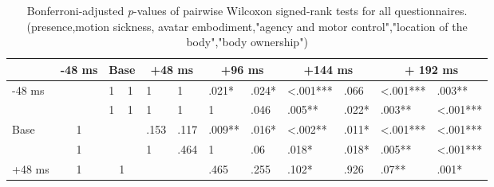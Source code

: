 \documentclass[sigconf]{acmart}
\begin{document}
\begin{table*}
\caption{Bonferroni-adjusted \textit{p}-values of pairwise Wilcoxon signed-rank tests for all questionnaires.\\ (\colorbox{I}{presence},\colorbox{M}{motion sickness}, \colorbox{C}{avatar embodiment},\colorbox{A}{"agency and motor control"},\colorbox{L}{"location of the body"},\colorbox{O}{"body ownership"})}

\setlength{\tabcolsep}{5pt}

\label{tab:commands}
\begin{tabularx}{16cm}{XXXXXXXXXXXXX}
\hline
                        & \multicolumn{2}{c}{-48 ms} 				& \multicolumn{2}{c}{Base} 					& \multicolumn{2}{c}{+48 ms} 								& \multicolumn{2}{c}{+96 ms} 				& \multicolumn{2}{c}{+144 ms} 					& \multicolumn{2}{c}{+ 192 ms}  				\\ \hline
\multirow{2}{*}{-48 ms}  &				&  				 			&\cellcolor{C}1& \cellcolor{A}1				&\cellcolor{C}1& \cellcolor{A}1 								&\cellcolor{C}\phantom{<}.021* & \cellcolor{A}\phantom{<}.024*   &\cellcolor{C}<.001***& \cellcolor{A}\phantom{<}.066\phantom{<} 		&\cellcolor{C}<.001*** & \cellcolor{A}\phantom{<}.003**	\\
                         &				& 							&\cellcolor{L}1& \cellcolor{O}1 				&\cellcolor{L}1 & \cellcolor{O}1    							&\cellcolor{L}1 & \cellcolor{O}\phantom{<}.046      	&\cellcolor{L}\phantom{<}.005**& \cellcolor{O}\phantom{<}.022*		&\cellcolor{L}\phantom{<}.003** & \cellcolor{O}<.001***	\\
\multirow{2}{*}{Base}    &\multicolumn{2}{c}{\cellcolor{I}1\phantom{<<<<<}}			&			   & 							&\cellcolor{C}\phantom{<}.153 & \cellcolor{A}\phantom{<}.117	&\cellcolor{C}\phantom{<}.009** & \cellcolor{A}\phantom{<}.016*	&\cellcolor{C}<.002** & \cellcolor{A}\phantom{<}.011*	&\cellcolor{C}<.001***& \cellcolor{A}<.001***  	\\
                       	 &\multicolumn{2}{c}{\cellcolor{M}1\phantom{<<<<<}}			&			   & 			 				&\cellcolor{L}1 & \cellcolor{O}\phantom{<}.464								&\cellcolor{L}1 & \cellcolor{O}\phantom{<}.06 		&\cellcolor{L}\phantom{<}.018*& \cellcolor{O}\phantom{<}.018*			&\cellcolor{L}\phantom{<}.005** & \cellcolor{O}<.001***  	\\
\multirow{2}{*}{+48 ms}  &\multicolumn{2}{c}{\cellcolor{I}1\phantom{<<<<<}}			&\multicolumn{2}{c}{\cellcolor{I}1\phantom{<<<<<}}			&			   	& 			 								&\cellcolor{C}\phantom{<}.465 & \cellcolor{A}\phantom{<}.255	&\cellcolor{C}\phantom{<}.102* & \cellcolor{A}\phantom{<}.926			&\cellcolor{C}\phantom{<}.07** & \cellcolor{A}\phantom{<}.001*  	\\

\end{tabularx}
\end{table*}
\end{document}
